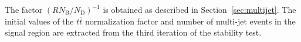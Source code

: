 
The factor $(RN_\text{B}/N_\text{D})^{-1}$ is obtained as described in Section~\ref{sec:multijet}. The initial values of the $t\bar{t}$ normalization factor and number of multi-jet events in the signal region are extracted from the third iteration of the stability test.%


